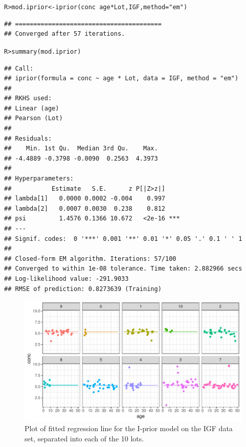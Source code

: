 \documentclass[showframe,11pt]{report}\usepackage[]{graphicx}\usepackage[]{color}
\makeatletter
\def\maxwidth{ %
  \ifdim\Gin@nat@width>\linewidth
    \linewidth
  \else
    \Gin@nat@width
  \fi
}
\newcommand{\hlstr}[1]{\textcolor[rgb]{0.063,0.58,0.627}{#1}}%
\newcommand{\hlopt}[1]{\textcolor[rgb]{0.196,0.196,0.196}{#1}}%
\newcommand{\hlstd}[1]{\textcolor[rgb]{0.196,0.196,0.196}{#1}}%
\newcommand{\hlkwb}[1]{\textcolor[rgb]{0.627,0,0.314}{#1}}%
\newcommand{\hlkwc}[1]{\textcolor[rgb]{0,0.631,0.314}{#1}}%
\newcommand{\hlkwd}[1]{\textcolor[rgb]{0.78,0.227,0.412}{#1}}%
\newenvironment{kframe}{%
 \def\at@end@of@kframe{}%
 \ifinner\ifhmode%
  \def\at@end@of@kframe{\end{minipage}}%
  \begin{minipage}{\columnwidth}%
 \fi\fi%
 \def\FrameCommand##1{\hskip\@totalleftmargin \hskip-\fboxsep
 \colorbox{shadecolor}{##1}\hskip-\fboxsep
     \hskip-\linewidth \hskip-\@totalleftmargin \hskip\columnwidth}%
 \MakeFramed {\advance\hsize-\width
   \@totalleftmargin\z@ \linewidth\hsize
   \@setminipage}}%
 {\par\unskip\endMakeFramed%
 \at@end@of@kframe}
\newenvironment{knitrout}{}{} %
\makeatother
\begin{document}
\begin{knitrout}
\color{fgcolor}\begin{kframe}
\begin{alltt}
\hlstd{R> }\hlstd{mod.iprior} \hlkwb{<-} \hlkwd{iprior}\hlstd{(conc} \hlopt{~} \hlstd{age} \hlopt{*} \hlstd{Lot, IGF,} \hlkwc{method} \hlstd{=} \hlstr{"em"}\hlstd{)}
\end{alltt}
\begin{verbatim}
## ========================================
## Converged after 57 iterations.
\end{verbatim}
\begin{alltt}
\hlstd{R> }\hlkwd{summary}\hlstd{(mod.iprior)}
\end{alltt}
\begin{verbatim}
## Call:
## iprior(formula = conc ~ age * Lot, data = IGF, method = "em")
## 
## RKHS used:
## Linear (age)
## Pearson (Lot)
## 
## Residuals:
##    Min. 1st Qu.  Median 3rd Qu.    Max. 
## -4.4889 -0.3798 -0.0090  0.2563  4.3973 
## 
## Hyperparameters:
##           Estimate   S.E.      z P[|Z>z|]    
## lambda[1]   0.0000 0.0002 -0.004    0.997    
## lambda[2]   0.0007 0.0030  0.238    0.812    
## psi         1.4576 0.1366 10.672   <2e-16 ***
## ---
## Signif. codes:  0 '***' 0.001 '**' 0.01 '*' 0.05 '.' 0.1 ' ' 1
## 
## Closed-form EM algorithm. Iterations: 57/100 
## Converged to within 1e-08 tolerance. Time taken: 2.882966 secs
## Log-likelihood value: -291.9033 
## RMSE of prediction: 0.8273639 (Training)
\end{verbatim}
\end{kframe}
\end{knitrout}
\begin{knitrout}
\color{fgcolor}\begin{figure}

{\centering \includegraphics[width=\maxwidth]{figure/04-IGF_mod_iprior_plot-1} 

}

\caption[Plot of fitted regression line for the I-prior model on the IGF data set, separated into each of the 10 lots]{Plot of fitted regression line for the I-prior model on the IGF data set, separated into each of the 10 lots.}\label{fig:IGF.mod.iprior.plot}
\end{figure}


\end{knitrout}
\end{document}
